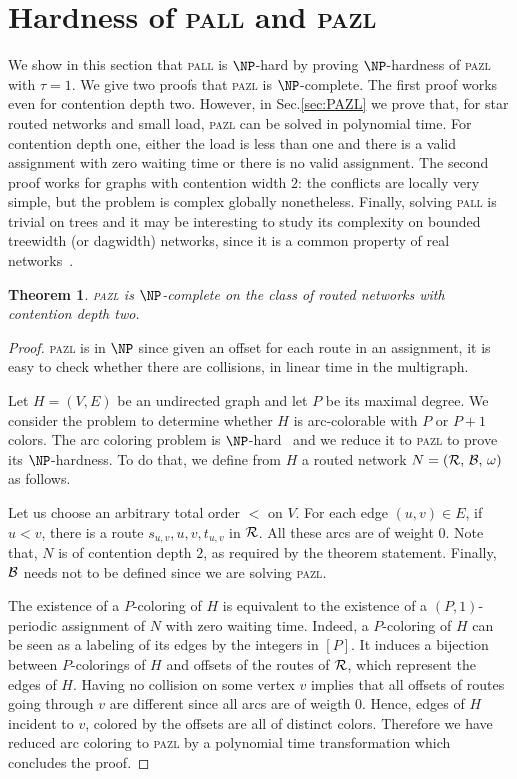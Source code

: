 \documentclass[a4paper,10pt]{article}
\newtheorem{theorem}{Theorem}
\newcommand\pazl{\textsc{pazl}\xspace}
\newcommand\pall{\textsc{pall}\xspace}
\begin{document}
\section{Hardness of \pall and \pazl}
  \label{sec:complexity}


	We show in this section that \pall is $\NP$-hard by proving $\NP$-hardness of \pazl with $\tau =1$. 
	We give two proofs that \pazl is $\NP$-complete.
	The first proof works even for contention depth two. However, in Sec.\ref{sec:PAZL} we prove
  	that, for star routed networks and small load, \pazl can be solved in polynomial time.
	 For contention depth one, either the load is less than one and there is a valid assignment with zero waiting time or there is no valid assignment. The second proof works for graphs with contention width $2$: the conflicts are locally very simple, but the problem is complex globally nonetheless. Finally, solving \pall is trivial on trees and it may be interesting to study its complexity on bounded treewidth (or dagwidth) networks, since it is a common property of real networks~\cite{de2011treewidth}.
 

 \begin{theorem}
\pazl is $\NP$-complete on the class of routed networks with contention depth two.
\end{theorem}
 \begin{proof}
 \pazl is in $\NP$ since given an offset for each route in an assignment, it is easy to check whether there are collisions, in linear time in the multigraph.
 
  Let $H=(V,E)$ be an undirected graph and let $P$ be its maximal degree. We consider the problem to determine whether $H$ is arc-colorable with $P$ or $P+1$ colors. The arc coloring problem is $\NP$-hard~\cite{holyer1981np} and we reduce it to \pazl to prove its $\NP$-hardness. To do that, we define from $H$ a routed network $N = ({\cal R},\, {\cal B},\, \omega)$ as follows. 

  Let us choose an arbitrary total order $<$ on $V$.
  For each edge $(u,v) \in E$, if $u<v$, there is a route $s_{u,v},u,v,t_{u,v}$ in ${\cal R}$. 
  All these arcs are of weight $0$. Note that, $N$ is of contention depth $2$, as required by the theorem statement. Finally, $ {\cal B}$ needs not to be defined since we are solving \pazl.
   
  The existence of a $P$-coloring of $H$ is equivalent to the existence of a $(P,1)$-periodic assignment of $N$ with zero waiting time. Indeed, a $P$-coloring of $H$ can be seen as a labeling of its edges by the integers in $[P]$. It induces a bijection between $P$-colorings of $H$ and offsets of the routes of ${\cal R}$, which represent the edges of $H$. Having no collision on some vertex $v$ implies that all offsets of routes going through $v$ are different since all arcs are of weigth $0$. Hence, edges of $H$ incident to $v$, colored by the offsets are all of distinct colors. Therefore we have reduced arc coloring to \pazl by a polynomial time transformation which concludes the proof. 
 \end{proof}
 
\end{document}
